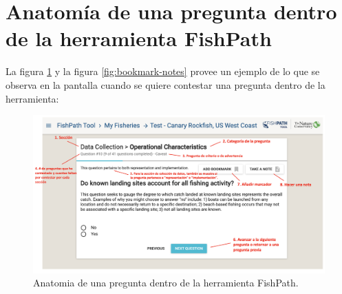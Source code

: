 \documentclass[
  11pt,
]{book}
\begin{document}
\hypertarget{anatomuxeda-de-una-pregunta-dentro-de-la-herramienta-fishpath}{%
\section{Anatomía de una pregunta dentro de la herramienta FishPath}\label{anatomuxeda-de-una-pregunta-dentro-de-la-herramienta-fishpath}}

La figura \ref{fig:question-anatomy} y la figura \ref{fig:bookmark-notes} provee un ejemplo de lo que se observa en la pantalla cuando se quiere contestar una pregunta dentro de la herramienta:

\begin{figure}
 
 {\centering \includegraphics[width=0.95\linewidth]{images/question-anatomy-es} 
 
 }
 
 \caption{Anatomia de una pregunta dentro de la herramienta FishPath.}\label{fig:question-anatomy}
 \end{figure}
\end{document}
